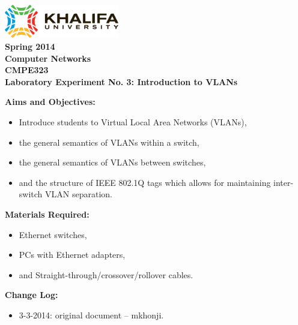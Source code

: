 \documentclass[pdftex,12pt,a4paper]{article}
\begin{document}
    \begin{titlepage}
        \begin{center}
            \includegraphics[width=5cm]{figures/kulogo}\\[1cm]
            {\Large \bfseries
                Spring 2014\\
                Computer Networks\\
                CMPE323\\[1cm]
            }
            {\large \bfseries
                \noindent Laboratory Experiment No. 3: Introduction to VLANs\\[1cm]
            }
        \end{center}

        \noindent \textbf{Aims and Objectives:}
            \begin{itemize}[leftmargin=4cm]
                \item Introduce students to Virtual Local Area Networks (VLANs),
                \item the general semantics of VLANs within a switch,
                \item the general semantics of VLANs between switches,
                \item and the structure of IEEE 802.1Q tags which allows for
                    maintaining inter-switch VLAN separation.
            \end{itemize}
            \vspace{0.5cm}

        \noindent \textbf{Materials Required:}
            \begin{itemize}[leftmargin=4cm]
                \item Ethernet switches,
                \item PCs with Ethernet adapters,
                \item and Straight-through/crossover/rollover cables.
            \end{itemize}
            \vspace{0.5cm}

        \noindent \textbf{Change Log:}
            \begin{itemize}[leftmargin=4cm]
                \item 3-3-2014: original document -- mkhonji.
            \end{itemize}
    \end{titlepage}
    \newpage
\end{document}
